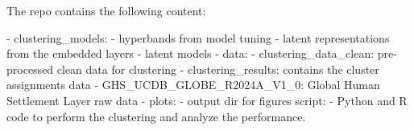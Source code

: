 The repo contains the following content: 

- clustering_models:
	- hyperbands from model tuning
	- latent representations from the embedded layers
	- latent models
- data: 
	- clustering_data_clean: pre-processed clean data for clustering
	- clustering_results: contains the cluster assignments data
	- GHS_UCDB_GLOBE_R2024A_V1_0: Global Human Settlement Layer raw data
- plots: 
	-  output dir for figures
script: 
	- Python and R code to perform the clustering and analyze the performance.
	